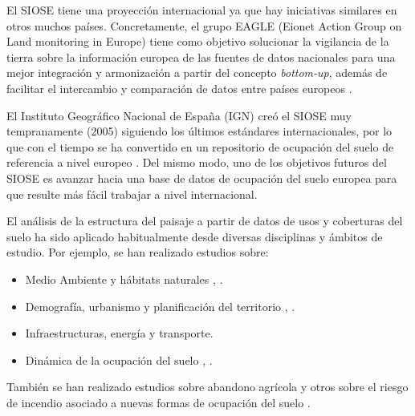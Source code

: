 El SIOSE tiene una proyección internacional ya que hay iniciativas similares en otros muchos países. Concretamente, el grupo EAGLE (Eionet Action Group on Land monitoring in Europe) tiene como objetivo solucionar la vigilancia de la tierra sobre la información europea de las fuentes de datos nacionales para una mejor integración y armonización a partir del concepto \textit{bottom-up}, además de facilitar el intercambio y comparación de datos entre países europeos \citep{Arnold2013}. 

El Instituto Geográfico Nacional de España (IGN) creó el SIOSE muy tempranamente (2005) siguiendo los últimos estándares internacionales, por lo que con el tiempo se ha convertido en un repositorio de ocupación del suelo de referencia a nivel europeo \citep{EquipoTecnicoNacionalSIOSE2015}. Del mismo modo, uno de los objetivos futuros del SIOSE es avanzar hacia una base de datos de ocupación del suelo europea para que resulte más fácil trabajar a nivel internacional.

El análisis de la estructura del paisaje a partir de datos de usos y coberturas del suelo ha sido aplicado habitualmente desde diversas disciplinas y ámbitos de estudio. Por ejemplo, se han realizado estudios sobre:

\begin{itemize}
\item Medio Ambiente y hábitats naturales \citep{Gine2014,Hamilton2009,Hebeisen2008}, \citep{GimenezFont2010,Lin2014,Brennan2005}.
\item Demografía, urbanismo y planificación del territorio \citep{Aguilera2011}, \citep{Blaschke1999,Jacquin2008,Tudor2014,Aguilera2010,Prastacos2017}.
\item Infraestructuras, energía y transporte.
\item Dinámica de la ocupación del suelo \citep{VanderKwast2011,Dunk2011,Herold2002}, \citep{Roces-Diaz2014,Aguilera2012,Liu2016,Rodriguez-Rodriguez2017}.
\end{itemize}

También se han realizado estudios sobre abandono agrícola \citep{Zaragozi2011} y otros sobre el riesgo de incendio asociado a nuevas formas de ocupación del suelo \citet{Vazquez2017}.

